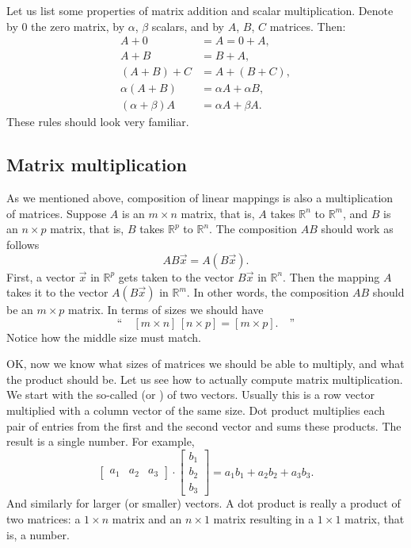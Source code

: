 Let us list some properties of matrix addition and scalar multiplication.
Denote by $0$ the zero matrix, by
$\alpha$, $\beta$ scalars, and by $A$, $B$, $C$ matrices.  Then:
\begin{align*}
A + 0 & = A = 0 + A , \\
A + B & = B + A , \\
(A + B) + C & = A + (B + C) , \\
\alpha(A+B) & = \alpha A+\alpha B, \\
(\alpha+\beta)A & = \alpha A + \beta A.
\end{align*}
These rules should look very familiar.

\subsection{Matrix multiplication}

As we mentioned above, composition of linear mappings is also a
multiplication of matrices.  Suppose $A$ is an $m \times n$ matrix,
that is, $A$ takes
${\mathbb R}^n$ to
${\mathbb R}^m$,
and $B$ is an $n \times p$ matrix, that is, $B$ takes
${\mathbb R}^p$ to
${\mathbb R}^n$.  The composition $AB$ should work as follows
\begin{equation*}
AB\vec{x} = A(B\vec{x}) .
\end{equation*}
First, a vector $\vec{x}$ in ${\mathbb R}^p$ gets taken to 
the vector $B\vec{x}$ in
${\mathbb R}^n$.  Then the mapping $A$ takes it to the vector $A(B\vec{x})$
in ${\mathbb R}^m$.  In other words, the composition $AB$ should be an $m
\times p$ matrix.  In terms of sizes we should have
\begin{equation*}
\text{``}
\quad
[ m \times n ]
\,
[ n \times p ]
=
[ m \times p ] . \quad
\text{''}
\end{equation*}
Notice how the middle size must match.

OK\@, now we know what sizes of matrices we should be able to multiply,
and what the product should be.
Let us see how to actually compute matrix multiplication.
We start with the so-called
\emph{} (or \emph{}) of two vectors.
Usually this is a row vector multiplied
with a column vector of the same size.  Dot product multiplies
each pair of entries from the first and the second vector and sums these
products.  The result is a single number.
For example,
\begin{equation*}
\begin{bmatrix}
a_1 & a_2 & a_3
\end{bmatrix}
\cdot
\begin{bmatrix}
b_1 \\
b_2 \\
b_3
\end{bmatrix}
= a_1 b_1 + a_2 b_2 + a_3 b_3 .
\end{equation*}
And similarly for larger (or smaller) vectors.
A dot product is really a product of two matrices: a $1 \times n$ matrix
and an $n \times 1$ matrix resulting in a $1 \times 1$ matrix, that is, a
number.

